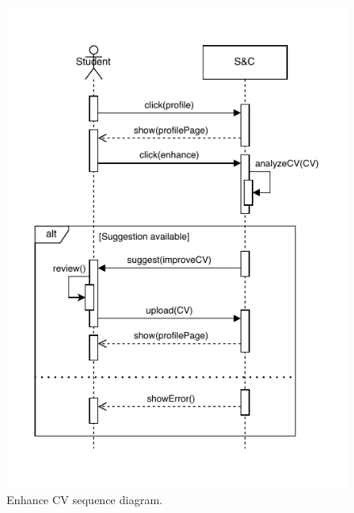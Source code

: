 \begin{figure}[H]
    \begin{center}
        \includegraphics[width=\linewidth]{Images/SequenceDiagram/EnhanceCVSD2.pdf}
        \caption{Enhance CV sequence diagram.}
        \label{fig:enhance_cv_seqdiag}%
    \end{center}
\end{figure}


